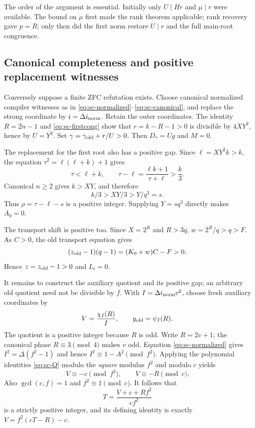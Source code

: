The order of the argument is essential.  Initially only
$U\mid Hr$ and $\mu\mid r$ were available.  The bound on $\mu$ first
made the rank theorem applicable; rank recovery gave $p=R$; only then
did the first norm restore $U\mid r$ and the full main-root congruence.

\subsection{Canonical completeness and positive replacement witnesses}

Conversely suppose a finite ZFC refutation exists.  Choose canonical
normalized compiler witnesses as in
\eqref{eq:sc-normalized}--\eqref{eq:sc-canonical}, and replace the strong
coordinate by $i=\Delta i_{\rm norm}$.  Retain the outer coordinates.
The identity $R=2n-1$ and \eqref{eq:sc-firstcong} show that
$r=k-R-1>0$ is divisible by $4XY^2$, hence by $U=Y^2$.
Set $\gamma=\gamma_{\rm old}+r/U>0$.  Then $D_*=Ug$ and $M=0$.

The replacement for the first root also has a positive gap.  Since
$\ell=XY^2k>k$, the equation
$\tau^2=\ell(\ell+k)+1$ gives
\[
 \tau<\ell+k,
 \qquad \tau-\ell=\frac{\ell k+1}{\tau+\ell}>\frac k3.
\]
Canonical $n\ge2$ gives $k>XY$, and therefore
\[
 k/3>XY/3>Y/q^3=s.
\]
Thus $\rho=\tau-\ell-s$ is a positive integer.  Supplying $Y=sq^3$
directly makes $A_0=0$.

The transport shift is positive too.  Since $X=2^R$ and $R>3q$,
$w=2^R/q>q>F$.  As $C>0$, the old transport equation gives
\[
 (z_{\rm old}-1)(q-1)=(K_0+w)C-F>0.
\]
Hence $z=z_{\rm old}-1>0$ and $L_t=0$.

It remains to construct the auxiliary quotient and its positive gap;
an arbitrary old quotient need not be divisible by $f$.
With $I=\Delta i_{\rm norm}c^2$, choose fresh auxiliary coordinates by
\[
 V=\frac{\chi_I(R)}I,
 \qquad y_{\rm old}=\psi_I(R).
\]
The quotient is a positive integer because $R$ is odd.
Write $R=2v+1$; the canonical phase $R\equiv3\pmod4$ makes $v$ odd.
Equation \eqref{eq:sc-normalized} gives
$I^2=\Delta(f^2-1)$ and hence
$I^2\equiv1-A^2\pmod{f^2}$.  Applying the polynomial identities
\eqref{eq:sc-Q} modulo the \emph{square} modulus $f^2$ and modulo $c$
yields
\[
 V\equiv-c\pmod{f^2},\qquad V\equiv-R\pmod c.
\]
Also $\gcd(c,f)=1$ and $f^2\equiv1\pmod c$.
It follows that
\begin{equation}\label{eq:sc-Tconstruct}
 T=\frac{V+c+Rf^2}{cf^2}
\end{equation}
is a strictly positive integer, and its defining identity is exactly
$V=f^2(cT-R)-c$.

